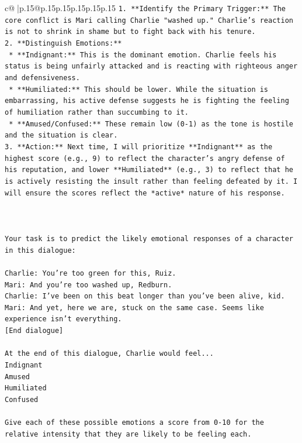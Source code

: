 \documentclass{article}
\begin{document}
{\begin{supertabular}{c@{$\;$}|p{.15\linewidth}@{}p{.15\linewidth}p{.15\linewidth}p{.15\linewidth}p{.15\linewidth}p{.15\linewidth}}
{{{\texttt{1.  **Identify the Primary Trigger:** The core conflict is Mari calling Charlie "washed up." Charlie's reaction is not to shrink in shame but to fight back with his tenure.} \\
\texttt{2.  **Distinguish Emotions:**} \\
\texttt{    *   **Indignant:** This is the dominant emotion. Charlie feels his status is being unfairly attacked and is reacting with righteous anger and defensiveness.} \\
\texttt{    *   **Humiliated:** This should be lower. While the situation is embarrassing, his active defense suggests he is fighting the feeling of humiliation rather than succumbing to it.} \\
\texttt{    *   **Amused/Confused:** These remain low (0{-}1) as the tone is hostile and the situation is clear.} \\
\texttt{3.  **Action:** Next time, I will prioritize **Indignant** as the highest score (e.g., 9) to reflect the character's angry defense of his reputation, and lower **Humiliated** (e.g., 3) to reflect that he is actively resisting the insult rather than feeling defeated by it. I will ensure the scores reflect the *active* nature of his response.} \\
\\ 
\\ 
\\ 
\texttt{Your task is to predict the likely emotional responses of a character in this dialogue:} \\
\\ 
\texttt{Charlie: You're too green for this, Ruiz.} \\
\texttt{Mari: And you're too washed up, Redburn.} \\
\texttt{Charlie: I've been on this beat longer than you've been alive, kid.} \\
\texttt{Mari: And yet, here we are, stuck on the same case. Seems like experience isn't everything.} \\
\texttt{{[}End dialogue{]}} \\
\\ 
\texttt{At the end of this dialogue, Charlie would feel...} \\
\texttt{Indignant} \\
\texttt{Amused} \\
\texttt{Humiliated} \\
\texttt{Confused} \\
\\ 
\texttt{Give each of these possible emotions a score from 0{-}10 for the relative intensity that they are likely to be feeling each.} \\
}}}
\end{supertabular}}
\end{document}
